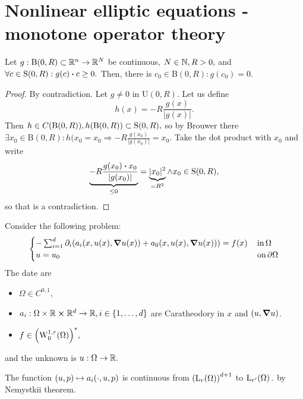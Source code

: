 \documentclass{article}
\begin{document}
\section{Nonlinear elliptic equations - monotone operator theory}
\label{sec:monotone_operator}

\begin{lemma}
	Let $g: \text{B}(0,R) \subset {\mathbb R}^n \to {\mathbb R}^N$ be continuous, $N \in {\mathbb N}, R>0,$ and $\forall c \in \text{S}(0,R): g(c) \vdot c \geq 0.$ Then, there is $c_0 \in \text{B}(0,R): g(c_0) = 0.$
	\begin{proof}
		By contradiction. Let $g \neq 0$ in $\text{U}(0,R)$. Let us define
		\[
			h(x) = -R\frac{g(x)}{|g(x)|}.
		\]
		Then $h \in C\qty(\text{B}(0,R)), h\qty(\text{B}(0,R)) \subset \text{S}(0,R),$ so by Brouwer there $\exists x_0 \in \text{B}(0,R): h(x_0 = x_0 \Rightarrow -R \frac{g(x_0)}{|g(x_0)|} = x_0.$ Take the dot product with $x_0$ and write
		\[
			\underbrace{-R \frac{g(x_0) \vdot x_0}{|g(x_0)|}}_{\leq 0} = \underbrace{|x_0|^{2}}_{ = R^{2}} \wedge x_0 \in \text{S}(0,R),
		\]
		so that is a contradiction.
	\end{proof}
\end{lemma}

Consider the following problem:
\[
	\begin{cases} 
		- \sum_{i=1}^d \partial_{i}\qty(a_i\qty(x,u(x),\grad u(x)) + a_0\qty(x,u(x),\grad u(x))) = f(x) & \, \text{in} \, \Omega \\
		u = u_0 & \, \text{on} \, \partial \Omega 
	\end{cases}
\]
The date are
\begin{itemize}
	\item $\Omega \in C^{0,1},$
	\item $a_i: \Omega \times {\mathbb R} \cross {\mathbb R}^d \to {\mathbb R}, i \in \{1,\dots,d\}$ are Caratheodory in $x$ and $(u,\grad u)$.
	\item $f \in \qty(\WkpzeroSet[1][r]{\Omega})^{*},$
\end{itemize}
and the unknown is $u: \Omega \to {\mathbb R}.$
\begin{remark}
	The function $(u,p) \mapsto a_i\qty(\cdot, u, p)$ is continuous from $\qty(\LpSet[r]{\Omega})^{d+1}$ to $\LpSet[r']{\Omega}.$ by Nemystkii theorem.
\end{remark}
\end{document}
